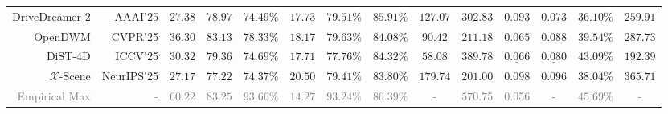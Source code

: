 {\begin{tabular}{r|r|cccccccc|cccc}
        \\
        DriveDreamer-2 \cite{zhao2024drivedreamer-2} & {\small AAAI'25} & $27.38$ & $78.97$ & $74.49\%$ & \underline{$17.73$} & $79.51\%$ & \cellcolor{w_blue!20}$\mathbf{85.91\%}$ & $127.07$ & \underline{$302.83$} & $0.093$ & \cellcolor{w_yellow!20}$\mathbf{0.073}$ & $36.10\%$ & $\underline{259.91}$
        \\
        OpenDWM \cite{opendwm} & {\small CVPR'25} & \cellcolor{w_blue!20}$\mathbf{36.30}$ & \cellcolor{w_blue!20}$\mathbf{83.13}$ & \cellcolor{w_blue!20}$\mathbf{78.33\%}$ & $18.17$ & \underline{$79.63\%$} & $84.08\%$ & \underline{$90.42$} & $211.18$ & \cellcolor{w_yellow!20}$\mathbf{0.065}$ & $0.088$ & $39.54\%$ & $287.73$
        \\
        DiST-4D \cite{guo2025dist-4d} & {\small ICCV'25} & $30.32$ & \underline{$79.36$} & $74.69\%$ & \cellcolor{w_blue!20}$\mathbf{17.71}$ & $77.76\%$ & $84.32\%$ & \cellcolor{w_blue!20}$\mathbf{58.08}$ & \cellcolor{w_blue!20}$\mathbf{389.78}$ & $\underline{0.066}$ & $\underline{0.080}$ & \cellcolor{w_yellow!20}$\mathbf{43.09\%}$ & \cellcolor{w_yellow!20}$\mathbf{192.39}$
        \\
        $\mathcal{X}$-Scene \cite{yang2025x-scene} & {\small NeurIPS'25} & $27.17$ & $77.22$ & $74.37\%$ & $20.50$ & $79.41\%$ & $83.80\%$ & $179.74$ & $201.00$ & $0.098$ & $0.096$ & $38.04\%$ & $365.71$
        \\
        \midrule
        \rowcolor{gray!7}\textcolor{gray}{Empirical Max} & \textcolor{gray}{-} & \textcolor{gray}{$60.22$} & \textcolor{gray}{$83.25$} & \textcolor{gray}{$93.66\%$} & \textcolor{gray}{$14.27$} & \textcolor{gray}{$93.24\%$} & \textcolor{gray}{$86.39\%$} & \textcolor{gray}{-} & \textcolor{gray}{$570.75$} & \textcolor{gray}{0.056} & \textcolor{gray}{-} & \textcolor{gray}{$45.69\%$} & \textcolor{gray}{-}
        \\
        \bottomrule
    \end{tabular}}
